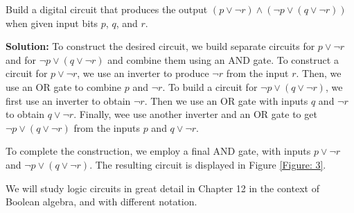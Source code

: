 \documentclass{Axon}
\begin{document}
\begin{example}\label{Example: 11}
    Build a digital circuit that produces the output \((p \lor \lnot r) \land (\lnot p \lor (q \lor \lnot r))\) when given input bits \(p\), \(q\), and \(r\).

    \noindent
    \textbf{Solution:}
    To construct the desired circuit, we build separate circuits for \(p \lor \lnot r\) and for \(\lnot p \lor (q \lor \lnot r)\) and combine them using an AND gate. To construct a circuit for \(p \lor \lnot r\), we use an inverter to produce \(\lnot r\) from the input \(r\). Then, we use an OR gate to combine \(p\) and \(\lnot r\). To build a circuit for \(\lnot p \lor (q \lor \lnot r)\), we first use an inverter to obtain \(\lnot r\). Then we use an OR gate with inputs \(q\) and \(\lnot r\) to obtain \(q \lor \lnot r\). Finally, wee use another inverter and an OR gate to get \(\lnot p \lor (q \lor \lnot r)\) from the inputs \(p\) and \(q \lor \lnot r\).

    To complete the construction, we employ a final AND gate, with inputs \(p \lor \lnot r\) and \(\lnot p \lor (q \lor \lnot r)\). The resulting circuit is displayed in Figure \ref{Figure: 3}.
\end{example}

We will study logic circuits in great detail in Chapter 12 in the context of Boolean algebra, and with different notation.

\printbibliography
\end{document}
